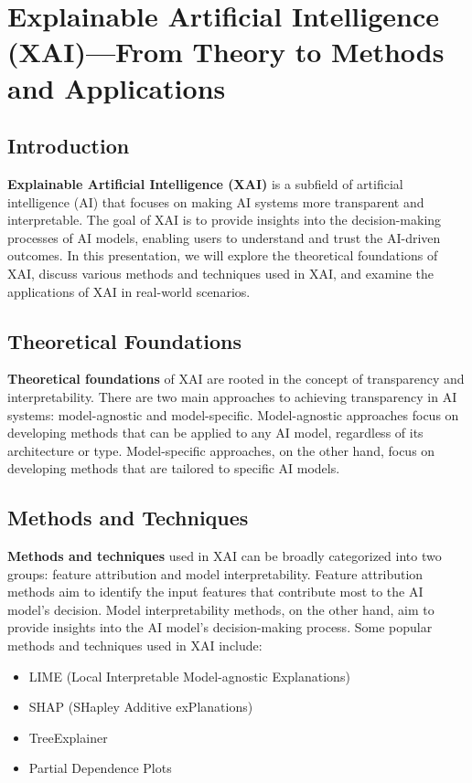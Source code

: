 

\section{Explainable Artificial Intelligence (XAI)---From Theory to Methods and Applications}
\subsection{Introduction}
\textbf{Explainable Artificial Intelligence (XAI)} is a subfield of artificial intelligence (AI) that focuses on making AI systems more transparent and interpretable. The goal of XAI is to provide insights into the decision-making processes of AI models, enabling users to understand and trust the AI-driven outcomes. In this presentation, we will explore the theoretical foundations of XAI, discuss various methods and techniques used in XAI, and examine the applications of XAI in real-world scenarios.

\subsection{Theoretical Foundations}
\textbf{Theoretical foundations} of XAI are rooted in the concept of transparency and interpretability. There are two main approaches to achieving transparency in AI systems: model-agnostic and model-specific. Model-agnostic approaches focus on developing methods that can be applied to any AI model, regardless of its architecture or type. Model-specific approaches, on the other hand, focus on developing methods that are tailored to specific AI models.\n
\subsection{Methods and Techniques}
\textbf{Methods and techniques} used in XAI can be broadly categorized into two groups: feature attribution and model interpretability. Feature attribution methods aim to identify the input features that contribute most to the AI model's decision. Model interpretability methods, on the other hand, aim to provide insights into the AI model's decision-making process. Some popular methods and techniques used in XAI include:\n\begin{itemize}
\item LIME (Local Interpretable Model-agnostic Explanations)
\item SHAP (SHapley Additive exPlanations)
\item TreeExplainer
\item Partial Dependence Plots
\end{itemize}

